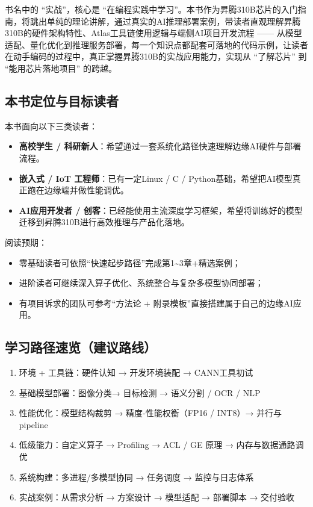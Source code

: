 书名中的 ``实战''，核心是
``在编程实践中学习''。本书作为昇腾310B芯片的入门指南，将跳出单纯的理论讲解，通过真实的AI推理部署案例，带读者直观理解昇腾310B的硬件架构特性、Atlas工具链使用逻辑与端侧AI项目开发流程
------
从模型适配、量化优化到推理服务部署，每一个知识点都配套可落地的代码示例，让读者在动手编码的过程中，真正掌握昇腾310B的实战应用能力，实现从
``了解芯片'' 到 ``能用芯片落地项目'' 的跨越。

\subsection*{本书定位与目标读者}\label{本书定位与目标读者}

本书面向以下三类读者：

\begin{itemize}
\tightlist
\item
  \textbf{高校学生 /
  科研新人}：希望通过一套系统化路径快速理解边缘AI硬件与部署流程。
\item
  \textbf{嵌入式 / IoT 工程师}：已有一定Linux / C /
  Python基础，希望把AI模型真正跑在边缘端并做性能调优。
\item
  \textbf{AI应用开发者 /
  创客}：已经能使用主流深度学习框架，希望将训练好的模型迁移到昇腾310B进行高效推理与产品化落地。
\end{itemize}

阅读预期：

\begin{itemize}
\tightlist
\item
  零基础读者可依照``快速起步路径''完成第1\textasciitilde3章+精选案例；
\item
  进阶读者可继续深入算子优化、系统整合与复杂多模型协同部署；
\item
  有项目诉求的团队可参考``方法论 +
  附录模板''直接搭建属于自己的边缘AI应用。
\end{itemize}

\subsection*{学习路径速览（建议路线）}\label{学习路径速览建议路线}

\begin{enumerate}
\def\labelenumi{\arabic{enumi}.}
\tightlist
\item
  环境 + 工具链：硬件认知 → 开发环境装配 → CANN工具初试
\item
  基础模型部署：图像分类→ 目标检测 → 语义分割 / OCR / NLP
\item
  性能优化：模型结构裁剪 → 精度-性能权衡（FP16 / INT8）→ 并行与pipeline
\item
  低级能力：自定义算子 → Profiling → ACL / GE 原理 → 内存与数据通路调优
\item
  系统构建：多进程/多模型协同 → 任务调度 → 监控与日志体系
\item
  实战案例：从需求分析 → 方案设计 → 模型适配 → 部署脚本 → 交付验收
\end{enumerate}

